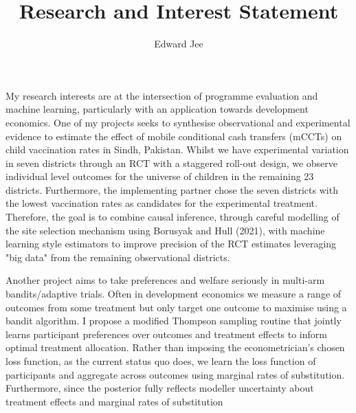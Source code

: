 \documentclass{article}
\author{Edward Jee}
\title{Research and Interest Statement}
\begin{document}
\maketitle

My research interests are at the intersection of programme evaluation and machine 
learning, particularly with an application towards development economics. One 
of my projects seeks to synthesise observational and experimental evidence to 
estimate the effect of mobile conditional cash transfers (mCCTs) on 
child vaccination rates in Sindh, Pakistan. Whilst we have experimental variation 
in seven districts through an RCT with a staggered roll-out design, we observe 
individual level outcomes for 
the universe of children in the remaining 23 districts. Furthermore, the implementing 
partner chose the seven districts with the lowest vaccination rates as candidates 
for the experimental treatment. Therefore, the goal is to combine causal inference, 
through careful modelling of the site selection mechanism using Borusyak and Hull (2021), 
with machine learning style estimators to improve precision of the RCT estimates 
leveraging "big data" from the remaining observational districts.



Another project aims to take preferences and welfare seriously in multi-arm 
bandits/adaptive trials. Often in development economics we measure a range of 
outcomes from some treatment but only target one outcome to maximise using a 
bandit algorithm. I propose a modified Thompson sampling routine that jointly 
learns participant preferences over outcomes and treatment effects to inform optimal treatment 
allocation. Rather than imposing the econometrician's chosen loss function, as 
the current status quo does, we learn the loss function of participants and 
aggregate across outcomes using marginal rates of substitution. Furthermore, 
since the posterior fully reflects modeller uncertainty about treatment effects 
and marginal rates of substitution 



    
\end{document}
